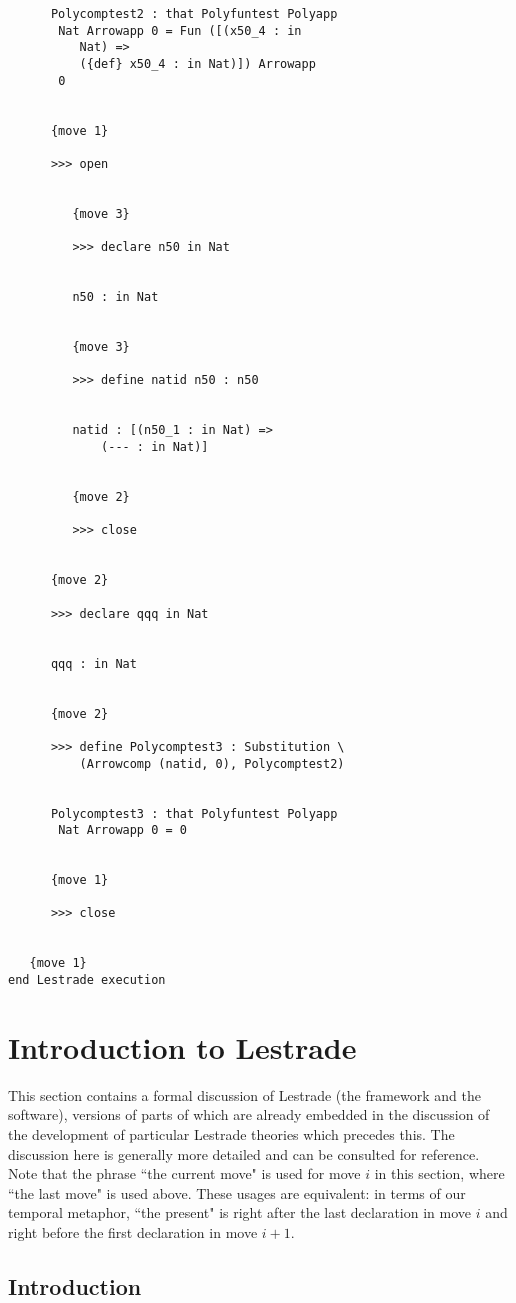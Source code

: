 \documentclass[12pt]{article}
\begin{document}
\begin{verbatim}
      Polycomptest2 : that Polyfuntest Polyapp 
       Nat Arrowapp 0 = Fun ([(x50_4 : in 
          Nat) => 
          ({def} x50_4 : in Nat)]) Arrowapp 
       0


      {move 1}

      >>> open


         {move 3}

         >>> declare n50 in Nat


         n50 : in Nat


         {move 3}

         >>> define natid n50 : n50


         natid : [(n50_1 : in Nat) => 
             (--- : in Nat)]


         {move 2}

         >>> close


      {move 2}

      >>> declare qqq in Nat


      qqq : in Nat


      {move 2}

      >>> define Polycomptest3 : Substitution \
          (Arrowcomp (natid, 0), Polycomptest2)


      Polycomptest3 : that Polyfuntest Polyapp 
       Nat Arrowapp 0 = 0


      {move 1}

      >>> close


   {move 1}
end Lestrade execution
\end{verbatim}


\section{Introduction to Lestrade}

This section contains a formal discussion of Lestrade (the framework and the software), versions of parts of which are already embedded in the discussion of the development of particular Lestrade theories which precedes this.  The discussion here is generally more detailed and can be consulted for reference.  Note that the phrase ``the current move" is used for move $i$ in this section, where ``the last move" is used above.  These usages are equivalent:  in terms of our temporal metaphor, ``the present" is right after the last declaration in move $i$ and right before the first declaration in move $i+1$.

\subsection{Introduction}
\end{document}
